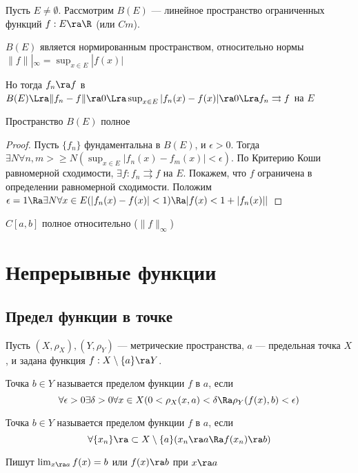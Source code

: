 \begin{definition}
    Пусть \(E \ne \emptyset\). Рассмотрим \(B(E)\) --- линейное пространство ограниченных функций \(f: E \ra \R\) (или \(Cm\)).
\end{definition}

\begin{note}
    \(B(E)\) является нормированным пространством, относительно нормы \(\|f\||_\infty = \sup_{x \in E} |f(x)|\)
\end{note}
Но тогда \(f_n \ra f\) в \(B(E) \Lra \|f_n - f\| \ra 0 \Lra \sup_{x \in E} |f_n(x) - f(x)| \ra 0 \Lra f_n \rightrightarrows f\) на \(E\)

\begin{lemma}
    Пространство \(B(E)\) полное
\end{lemma}
\begin{proof}
    Пусть \(\{f_n\}\) фундаментальна в \(B(E)\), и \(\epsilon > 0\). Тогда \(\exists N \forall n, m > \ge N (\sup_{x \in E} |f_n(x) - f_m(x)| < \epsilon)\). По Критерию Коши равномерной сходимости, \(\exists f: f_n \rightrightarrows f\) на \(E\). Покажем, что \(f\) ограничена в определении равномерной сходимости. Положим \(\epsilon = 1 \Ra \exists N \forall x \in E (|f_n(x) - f(x)| < 1) \Ra |f(x) < 1 + |f_n(x)||\)
\end{proof}

\begin{note}
    \(C[a, b]\) полное относительно (\(\|f\|_\infty\))
\end{note}

\section{Непрерывные функции}
\subsection{Предел функции в точке}
Пусть \((X, \rho_X), (Y, \rho_Y)\) --- метрические пространства, \(a\) --- предельная точка \(X\), и задана функция \(f: X \setminus \{a\} \ra Y\).

\begin{definition}[Коши]
    Точка \(b \in Y\) называется пределом функции \(f\) в \(a\), если
    \[\forall \epsilon > 0 \exists \delta > 0 \forall x \in X (0 < \rho_X(x, a) < \delta \Ra \rho_Y(f(x), b) < \epsilon)\]
\end{definition}

\begin{definition}[Гейне]
    Точка \(b \in Y\) называется пределом функции \(f\) в \(a\), если
    \[\forall \{x_n\} \ra \subset X\setminus \{a\} (x_n \ra a \Ra f(x_n) \ra b)\]
\end{definition}
Пишут \(\lim_{x \ra a} f(x) = b\) или \(f(x) \ra b\) при \(x \ra a\)

